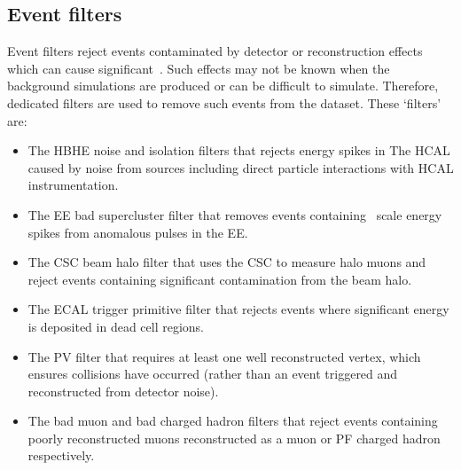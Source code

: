 \subsection{Event filters}
\label{sec:event_filters}
Event filters reject events contaminated by detector or reconstruction effects
which can cause significant~\met. Such effects may not be known when the 
background simulations are produced or can be difficult to simulate. Therefore,
dedicated filters are used to remove such events from the dataset. These `\met filters' 
are:

\begin{itemize}
\item The HBHE noise and isolation filters that rejects energy spikes in The HCAL caused by noise from sources 
including direct particle interactions with HCAL instrumentation.
\item The EE bad supercluster filter that removes events containing \TeV~scale energy spikes from anomalous
pulses in the EE.
\item The CSC beam halo filter that uses the CSC to measure halo muons and reject events containing 
significant contamination from the beam halo.
\item The ECAL trigger primitive filter that rejects events where significant energy is deposited in dead cell regions.
\item The PV filter that requires at least one well reconstructed vertex, which ensures collisions have occurred (rather than an event triggered and reconstructed from detector noise).
\item The bad muon and bad charged hadron filters that reject events containing poorly reconstructed muons reconstructed as 
a muon or PF charged hadron respectively.
\end{itemize}

